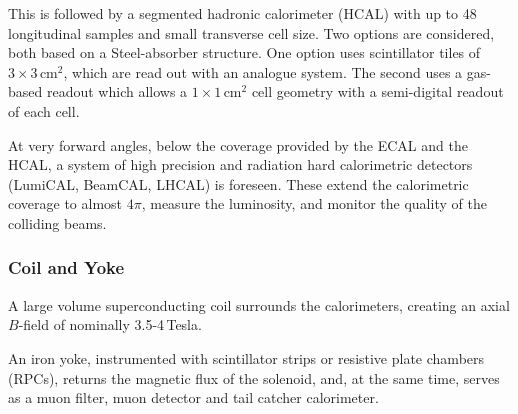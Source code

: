 This is followed by a segmented hadronic calorimeter (HCAL) with up to 48 longitudinal samples and small transverse cell size. Two 
options are considered, both based on a Steel-absorber structure. One option uses scintillator tiles of $3 \times 3$\,cm$^2$, 
which are read out with an analogue system. The second uses a gas-based readout which allows a $1 \times 1$\,cm$^2$ 
cell geometry with a semi-digital readout of each cell. 

At very forward angles, below the coverage provided by the ECAL and the HCAL, a system of high precision and radiation hard calorimetric detectors (LumiCAL, BeamCAL, LHCAL) is foreseen. These
extend the calorimetric coverage to almost $4\pi$, measure the luminosity, and  monitor the quality of the colliding beams.

\subsubsection{Coil and Yoke}
A large volume superconducting coil surrounds the calorimeters, creating an axial $B$-field of nominally 3.5-4\,Tesla.

An iron  yoke, instrumented with scintillator strips or resistive plate chambers (RPCs), returns the magnetic flux of the solenoid, and, at the same time, serves as a muon filter, muon detector and tail catcher calorimeter.

